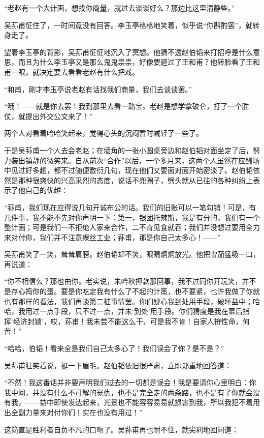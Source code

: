 \par “老赵有一个大计画，想找你商量，就过去谈谈好么？那边比这里清静些。”
\par 吴荪甫怔住了，一时间竟没有回答。李玉亭格格地笑着，似乎说“你斟酌罢”，就转身走了。
\par 望着李玉亭的背影，吴荪甫怔怔地沉入了冥想。他猜不透赵伯韬来打招呼是什么意思，而且为什么李玉亭又是那么鬼鬼祟祟，好像要避过了王和甫？他转脸看了王和甫一眼，就决定要去看看老赵有什么把戏。
\par “和甫，刚才李玉亭说老赵有话找我们商量，我们去谈谈罢。”
\par “哦！——就是你去罢！我到那里去看一路宝。老赵是想学拿破仑，打了一个胜仗，就提出外交公文来了！”
\par 两个人对看着哈哈笑起来，觉得心头的沉闷暂时减轻了一些了。
\par 于是吴荪甫一个人去会老赵；在墙角的一张小圆桌旁边和赵伯韬对面坐定了后，努力装出镇静的微笑来。自从前次“合作”以后，一个多月来，这两个人虽然在应酬场中见过好多趟，都不过随便敷衍几句，现在他们又要面对面开始密谈了。赵伯韬依然是那种很爽快的兴高采烈的态度，说话不兜圈子，劈头就从已往的各种纠纷上表示了他自己的优越：
\par “荪甫，我们现在应得说几句开诚布公的话。我们的旧账可以一笔勾销！可是，有几件事，我不能不先对你声明一下：第一，银团托辣斯，我是有分的，我们有一个整计画；可是我们一不拒绝人家来合作，二不肯见食就吞；我们并没想过要用全力来对付你，我们并不注意缫丝工业；荪甫，那是你自己太多心！——”
\par 吴荪甫笑了一笑，耸耸肩膀。赵伯韬却不笑，眼睛炯炯放光。他把雪茄猛吸一口，再说道：
\par “你不相信么？那也由你。老实说，朱吟秋押款那回事，我不过同你开玩笑，并不是存心捣你的蛋。要是你吃定我有什么了不起的计策，也不要紧，也许我做了你就也有那样的看法，我们再谈第二桩事情罢。你们疑心我到处用手段，破坏益中；哈哈，我用过一点手段，只不过一点，并未‘到处’用手段。你们猜度是我在幕后指挥‘经济封锁’，哎，荪甫！我未尝不能这么干，可是我不肯！自家人拚性命，何苦！”
\par “哈哈，伯韬！看来全是我们自己太多心了！我们误会了你？是不是？”
\par 吴荪甫狂笑着说，挺一下眉毛。赵伯韬依旧很严肃，立即郑重地回答道：
\par “不然！我这番话并非要声明我们过去的一切都是误会！我是要请你心里明白：你我中间，并没有什么不可解的冤仇，也不是完全走的两条路，也不是有了你就会没有我，——益中即使发达起来，光景也不能容容易易就损害到我，所以我犯不着用出全副力量来对付你们！实在也没有用过！”
\par 这简直是胜利者自负不凡的口吻了。吴荪甫再也耐不住，就尖利地回问道：
